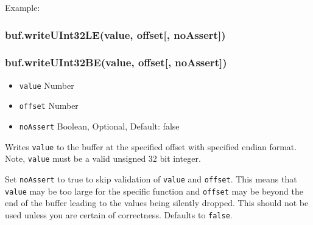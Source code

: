 Example:

\begin{Shaded}
\begin{Highlighting}[]
  \NormalTok{(}\NormalTok{);}
\NormalTok{(}\NormalTok{, }\NormalTok{);}
\NormalTok{(}\NormalTok{, }\NormalTok{);}


\NormalTok{(}\NormalTok{, }\NormalTok{);}
\NormalTok{(}\NormalTok{, }\NormalTok{);}


\end{Highlighting}
\end{Shaded}

\subsubsection{buf.writeUInt32LE(value, offset{[},
noAssert{]})}\label{buf.writeuint32levalue-offset-noassert}

\subsubsection{buf.writeUInt32BE(value, offset{[},
noAssert{]})}\label{buf.writeuint32bevalue-offset-noassert}

\begin{itemize}
\itemsep1pt\parskip0pt
\item
  \texttt{value} Number
\item
  \texttt{offset} Number
\item
  \texttt{noAssert} Boolean, Optional, Default: false
\end{itemize}

Writes \texttt{value} to the buffer at the specified offset with
specified endian format. Note, \texttt{value} must be a valid unsigned
32 bit integer.

Set \texttt{noAssert} to true to skip validation of \texttt{value} and
\texttt{offset}. This means that \texttt{value} may be too large for the
specific function and \texttt{offset} may be beyond the end of the
buffer leading to the values being silently dropped. This should not be
used unless you are certain of correctness. Defaults to \texttt{false}.

